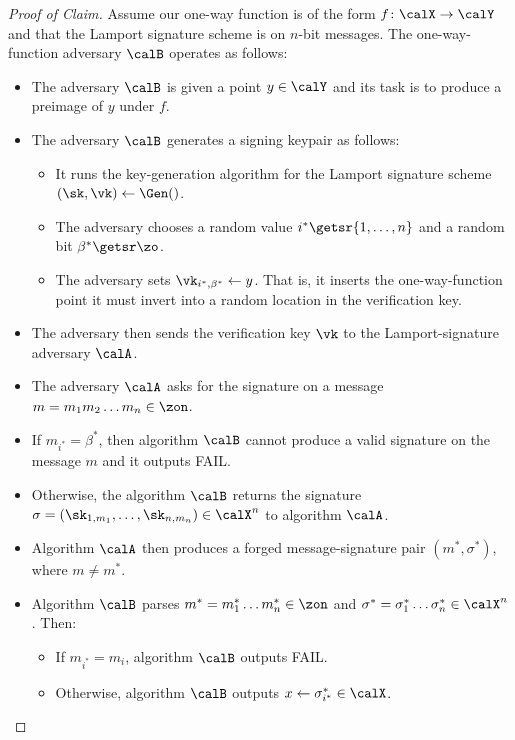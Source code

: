 \begin{proof}[Proof of Claim]
Assume our one-way function is of the form $f \colon \calX \to \calY$
and that the Lamport signature scheme is on $n$-bit messages.
The one-way-function adversary $\calB$ operates as follows:
\begin{itemize}[noitemsep]
  \item The adversary $\calB$ is given a point $y \in \calY$
    and its task is to produce a preimage of $y$ under $f$. 
  \item The adversary $\calB$ generates a signing keypair as follows:
    \begin{itemize}[noitemsep]
      \item It runs the key-generation algorithm for the Lamport signature scheme $(\sk, \vk) \gets \Gen()$.
      \item The adversary chooses a random value $i^* \getsr \{1, \dots, n\}$
            and a random bit $\beta^* \getsr \zo$.
          \item The adversary sets $\vk_{i^*,\beta^*} \gets y$.
            That is, it inserts the one-way-function point it must invert
            into a random location in the verification key.
    \end{itemize}
  \item The adversary then sends the verification key $\vk$ to the Lamport-signature adversary $\calA$.
  \item The adversary $\calA$ asks for the signature on a message $m = m_1 m_2 \dots m_n \in \zon$.
  \item If $m_{i^*} = \beta^*$, then algorithm $\calB$ cannot produce a valid signature on the message
        $m$ and it outputs FAIL.
  \item Otherwise, the algorithm $\calB$ returns the signature $\sigma = (\sk_{1,m_1}, \dots, \sk_{n,m_n}) \in \calX^n$
        to algorithm $\calA$.
  \item Algorithm $\calA$ then produces a forged message-signature pair $(m^*, \sigma^*)$,
        where $m \neq m^*$.
  \item Algorithm $\calB$ parses $m^* = m^*_1 \dots m^*_n \in \zon$
        and $\sigma^* = \sigma^*_1 \dots \sigma^*_n \in \calX^n$. Then:
        \begin{itemize}[noitemsep]
          \item If $m_{i^*} = m_i$, algorithm $\calB$ outputs FAIL.
          \item Otherwise, algorithm $\calB$ outputs $x \gets \sigma^*_{i^*} \in \calX$.
        \end{itemize}
\end{itemize}


\end{proof}
